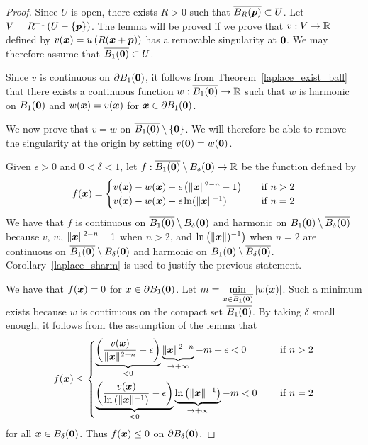 \begin{proof}
Since $U$ is open, there exists $R>0$ such that
$\overline{B_R({\bm{p}})} \subset U$.
Let $\displaystyle V = R^{-1} \left( U - \{{\bm{p}}\} \right)$.
The lemma will be proved if we prove that
$\displaystyle v: V  \to \mathbb{R}$ defined by
$\displaystyle v({\bm{x}}) = u\left(R({\bm{x}} + {\bm{p}})\right)$
has a removable singularity at ${\bm{0}}$.  We may therefore assume
that $\displaystyle \overline{B_1({\bm{0}})} \subset U$.

Since $v$ is continuous on $\partial B_1({\bm{0}})$, it follows
from Theorem~\ref{laplace_exist_ball} that there exists a continuous
function $w: \overline{B_1({\bm{0}})} \to \mathbb{R}$ such that
$w$ is harmonic on $B_1({\bm{0}})$ and $w({\bm{x}}) = v({\bm{x}})$
for ${\bm{x}} \in \partial B_1({\bm{0}})$.

We now prove that $v=w$ on
$\overline{B_1({\bm{0}})}\setminus\{{\bm{0}}\}$.  We will therefore be
able to remove the singularity at the origin by setting
$v({\bm{0}}) = w({\bm{0}})$. 

Given $\epsilon >0$ and $0<\delta<1$, let
$f: \overline{B_1({\bm{0}})} \setminus B_\delta({\bm{0}}) \to \mathbb{R}$
be the function defined by
\[
f({\bm{x}}) =  
\begin{cases}
v({\bm{x}}) - w({\bm{x}}) - \epsilon \left( \|{\bm{x}}\|^{2-n} - 1 \right)
& \quad \text{if} \ n > 2 \\
v({\bm{x}}) - w({\bm{x}}) - \epsilon \ln(\|{\bm{x}}\|^{-1})
& \quad \text{if} \ n = 2 \\
\end{cases}
\]
We have that $f$ is continuous on
$\displaystyle \overline{B_1({\bm{0}})} \setminus B_\delta({\bm{0}})$
and harmonic on
$\displaystyle B_1({\bm{0}}) \setminus \overline{B_\delta({\bm{0}})}$
because $v$, $w$, $\displaystyle \|{\bm{x}}\|^{2-n} - 1$ when $n>2$,
and $\displaystyle \ln\left(\|{\bm{x}}\|)^{-1}\right)$ when $n=2$ are
continuous on
$\displaystyle \overline{B_1({\bm{0}})} \setminus B_\delta({\bm{0}})$
and harmonic on
$\displaystyle B_1({\bm{0}}) \setminus \overline{B_\delta({\bm{0}})}$.
Corollary~\ref{laplace_sharm} is used to justify the previous
statement.

We have that $f({\bm{x}}) = 0$ for ${\bm{x}} \in \partial B_1({\bm{0}})$.
Let $\displaystyle m = \min_{{\bm{x}} \in \overline{B_1({\bm{0}})}} |w({\bm{x}})|$.
Such a minimum exists because $w$ is continuous on the compact set
$\overline{B_1({\bm{0}})}$.  By taking $\delta$ small enough, it
follows from the assumption of the lemma that
\[
f({\bm{x}}) \leq
\begin{cases}
\displaystyle \underbrace{\left(
\frac{v({\bm{x}})}{\|{\bm{x}}\|^{2-n}} - \epsilon \right)}_{<0}
\underbrace{\|{\bm{x}}\|^{2-n}}_{\to +\infty} - m + \epsilon < 0 \quad
& \ \text{if}\ n > 2 \\[2.5em]
\displaystyle \underbrace{\left(
\frac{v({\bm{x}})}{\ln\left(\|{\bm{x}}\|^{-1}\right)} - \epsilon \right)}_{<0}
\underbrace{\ln\left(\|{\bm{x}}\|^{-1}\right)}_{\to +\infty} - m < 0
\quad & \ \text{if}\ n = 2
\end{cases}
\]
for all ${\bm{x}} \in B_\delta({\bm{0}})$.
Thus $f({\bm{x}}) \leq 0$ on $\partial B_\delta({\bm{0}})$.


\end{proof}
